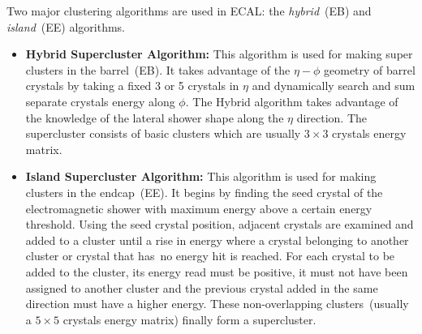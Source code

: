 Two major clustering algorithms are used in ECAL: the \textit{hybrid}~(EB) and \textit{island}~(EE) algorithms.
\begin{itemize}
\item \textbf{Hybrid Supercluster Algorithm:} This algorithm is used for making super clusters in the barrel~(EB). It takes advantage of the $\eta - \phi$ geometry of barrel crystals by taking a fixed 3 or 5 crystals in $\eta$ and dynamically search and sum separate crystals energy along $\phi$. The Hybrid algorithm takes advantage of the knowledge of the lateral shower shape along the $\eta$ direction. The supercluster consists of basic clusters which are usually $3\times3$ crystals energy matrix.

\item \textbf{Island Supercluster Algorithm:} This algorithm is used for making clusters in the endcap~(EE). It begins by finding the seed crystal of the electromagnetic shower with maximum energy above a certain energy threshold. Using the seed crystal position, adjacent crystals are examined %
and added to a cluster until a rise in energy where a crystal belonging to another cluster or crystal that has\ no energy hit is reached. For each crystal to be added to the cluster, its energy read must be positive, it must not have been assigned to another cluster and the previous crystal added in the same direction must have a higher energy. These non-overlapping clusters~(usually a $5\times5$ crystals energy matrix) finally form a supercluster.
\end{itemize} 

